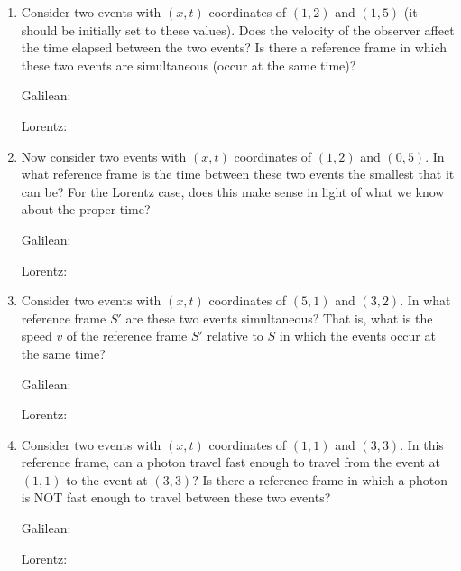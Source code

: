 \begin{enumerate}
\item Consider two events with $(x,t)$ coordinates of $(1,2)$ and $(1,5)$ (it should be initially set to these values).  Does the velocity of the observer affect the time elapsed between the two events?  Is there a reference frame in which these two events are simultaneous (occur at the same time)?  

\bigskip
\hspace{0.5in}Galilean:

\bigskip
\hspace{0.5in}Lorentz:
\answerspace{0.5in}

\item Now consider two events with $(x,t)$ coordinates of $(1,2)$ and $(0,5)$. In what reference frame is the time between these two events the smallest that it can be?  For the Lorentz case, does this make sense in light of what we know about the proper time?

\bigskip
\hspace{0.5in}Galilean:

\bigskip
\hspace{0.5in}Lorentz:
\answerspace{0.5in}

\item Consider two events with $(x,t)$ coordinates of $(5,1)$ and $(3,2)$. In what reference frame $S'$ are these two events simultaneous? That is, what is the speed $v$ of the reference frame $S'$ relative to $S$ in which the events occur at the same time?

\bigskip
\hspace{0.5in}Galilean:

\bigskip
\hspace{0.5in}Lorentz:
\answerspace{0.5in}

\item Consider two events with $(x,t)$ coordinates of $(1,1)$ and $(3,3)$. In this reference frame, can a photon travel fast enough to travel from the event at $(1,1)$ to the event at $(3,3)$?  Is there a reference frame in which a photon is NOT fast enough to travel between these two events?

\bigskip
\hspace{0.5in}Galilean:

\bigskip
\hspace{0.5in}Lorentz:
\answerspace{0.5in}

\end{enumerate}
